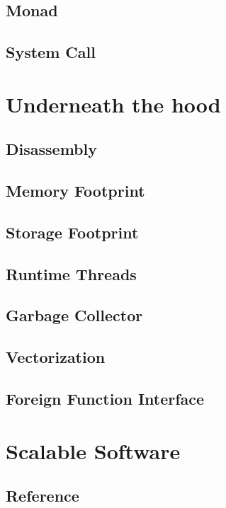 \documentclass{kdp}
\begin{document}
\chapter{Monad}

\chapter{System Call}

\part{Underneath the hood}

\chapter{Disassembly}

\chapter{Memory Footprint}

\chapter{Storage Footprint}

\chapter{Runtime Threads}

\chapter{Garbage Collector}

\chapter{Vectorization}

\chapter{Foreign Function Interface}

\part{Scalable Software}

\chapter{Reference}
\end{document}

